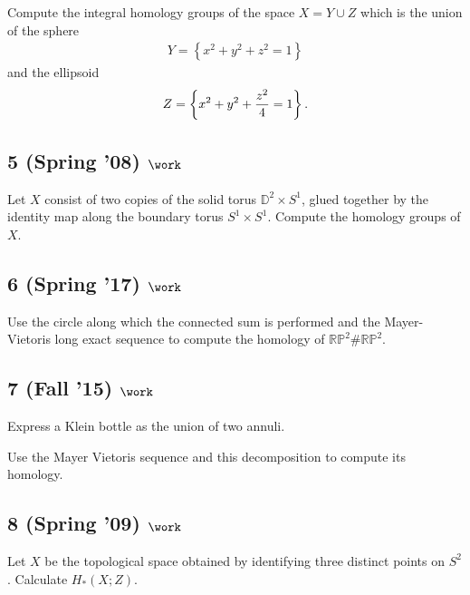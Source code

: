 Compute the integral homology groups of the space \(X = Y \cup Z\) which
is the union of the sphere
\begin{align*}
Y = \left\{{x^2 + y^2 + z^2 = 1}\right\}
\end{align*}
and the ellipsoid
\begin{align*}
Z =  \left\{{x^2 + y^2 + {z^2 \over 4} = 1}\right\}
.\end{align*}

\hypertarget{spring-08-work-2}{%
\subsection{\texorpdfstring{5 (Spring '08)
\(\work\)}{5 (Spring '08) \textbackslash work}}\label{spring-08-work-2}}

Let \(X\) consist of two copies of the solid torus
\({\mathbb{D}}^2 \times S^1\), glued together by the identity map along
the boundary torus \(S^1 \times S^1\). Compute the homology groups of
\(X\).

\hypertarget{spring-17-work-1}{%
\subsection{\texorpdfstring{6 (Spring '17)
\(\work\)}{6 (Spring '17) \textbackslash work}}\label{spring-17-work-1}}

Use the circle along which the connected sum is performed and the
Mayer-Vietoris long exact sequence to compute the homology of
\({\mathbb{RP}}^2 \# {\mathbb{RP}}^2\).

\hypertarget{fall-15-work-1}{%
\subsection{\texorpdfstring{7 (Fall '15)
\(\work\)}{7 (Fall '15) \textbackslash work}}\label{fall-15-work-1}}

Express a Klein bottle as the union of two annuli.

Use the Mayer Vietoris sequence and this decomposition to compute its
homology.

\hypertarget{spring-09-work-4}{%
\subsection{\texorpdfstring{8 (Spring '09)
\(\work\)}{8 (Spring '09) \textbackslash work}}\label{spring-09-work-4}}

Let \(X\) be the topological space obtained by identifying three
distinct points on \(S^2\). Calculate \(H_* (X; Z)\).

